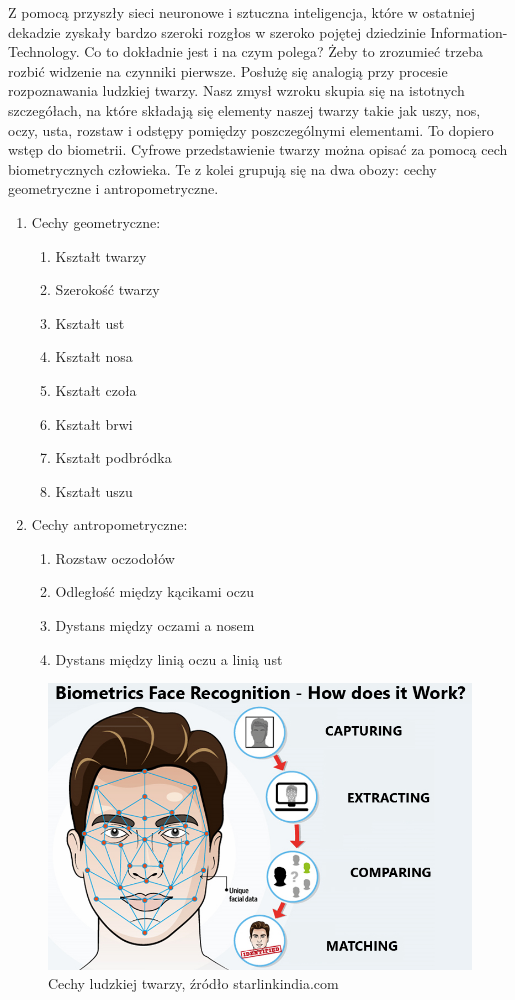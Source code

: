 \documentclass{article}
\begin{document}
	\par
	Z pomocą przyszły sieci neuronowe i sztuczna inteligencja, które w ostatniej dekadzie zyskały bardzo szeroki rozgłos w szeroko pojętej dziedzinie Information-Technology. Co to dokładnie jest i na czym polega? Żeby to zrozumieć trzeba rozbić widzenie na czynniki pierwsze. Posłużę się analogią przy procesie rozpoznawania ludzkiej twarzy. Nasz zmysł wzroku skupia się na istotnych szczegółach, na które składają się elementy naszej twarzy takie jak uszy, nos, oczy, usta, rozstaw i odstępy pomiędzy poszczególnymi elementami. To dopiero wstęp do biometrii. Cyfrowe przedstawienie twarzy można opisać za pomocą cech biometrycznych człowieka. Te z kolei grupują się na dwa obozy: cechy geometryczne i antropometryczne.
	\begin{enumerate}
		\item Cechy geometryczne:
		\begin{enumerate}
			\item Kształt twarzy
			\item Szerokość twarzy
			\item Kształt ust
			\item Kształt nosa
			\item Kształt czoła
			\item Kształt brwi
			\item Kształt podbródka
			\item Kształt uszu
		\end{enumerate}
		\item Cechy antropometryczne:
		\begin{enumerate}
			\item Rozstaw oczodołów
			\item Odległość między kącikami oczu
			\item Dystans między oczami a nosem
			\item Dystans między linią oczu a linią ust
		\end{enumerate}
	\end{enumerate}
	\begin{figure}
		\centering
		\includegraphics[width=15cm]{face}
		\caption{Cechy ludzkiej twarzy, źródło starlinkindia.com}
	\end{figure}
\end{document}
